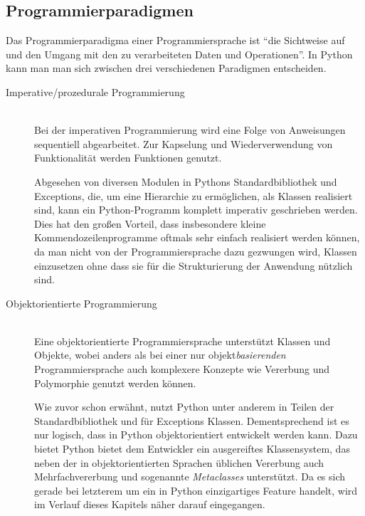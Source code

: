\subsection{Programmierparadigmen}

Das Programmierparadigma einer Programmiersprache ist \enquote{die Sichtweise auf und den Umgang mit
den zu verarbeiteten Daten und Operationen}. \citep[Kap. 1.3.1]{progsprachen} In Python kann man
man sich zwischen drei verschiedenen Paradigmen entscheiden.

\begin{description}
\item[Imperative/prozedurale Programmierung] \hfill \\
Bei der imperativen Programmierung wird eine Folge von Anweisungen sequentiell abgearbeitet. Zur
Kapselung und Wiederverwendung von Funktionalität werden Funktionen genutzt.
\citep[Kap. 1.3.1]{progsprachen}

Abgesehen von diversen Modulen in Pythons Standardbibliothek und Exceptions, die, um eine Hierarchie
zu ermöglichen, als Klassen realisiert sind, kann ein Python-Programm komplett imperativ geschrieben
werden. Dies hat den großen Vorteil, dass insbesondere kleine Kommendozeilenprogramme oftmals sehr
einfach realisiert werden können, da man nicht von der Programmiersprache dazu gezwungen wird,
Klassen einzusetzen ohne dass sie für die Strukturierung der Anwendung nützlich sind.



\item[Objektorientierte Programmierung] \hfill \\
Eine objektorientierte Programmiersprache unterstützt Klassen und Objekte, wobei anders als bei
einer nur objekt\emph{basierenden} Programmiersprache auch komplexere Konzepte wie Vererbung und
Polymorphie genutzt werden können.
\citep[Kap. 1.3.1]{progsprachen}

Wie zuvor schon erwähnt, nutzt Python unter anderem in Teilen der Standardbibliothek und für
Exceptions Klassen. Dementsprechend ist es nur logisch, dass in Python objektorientiert entwickelt
werden kann. Dazu bietet Python bietet dem Entwickler ein ausgereiftes Klassensystem, das neben der
in objektorientierten Sprachen üblichen Vererbung auch Mehrfachvererbung und sogenannte
\emph{Metaclasses} unterstützt. Da es sich gerade bei letzterem um ein in Python einzigartiges
Feature handelt, wird im Verlauf dieses Kapitels näher darauf eingegangen.




\end{description}
